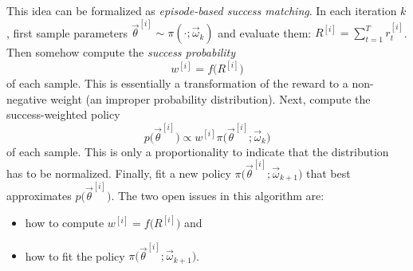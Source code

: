 		This idea can be formalized as \emph{episode-based success matching}. In each iteration \(k\), first sample parameters \( \vec{\theta}^{[i]} \sim \pi(\cdot; \vec{\omega}_k) \) and evaluate them: \( R^{[i]} = \sum_{t = 1}^{T} r_t^{[i]} \). Then somehow compute the \emph{success probability}
		\begin{equation*}
			w^{[i]} = f\big( R^{[i]} \big)
		\end{equation*}
		of each sample. This is essentially a transformation of the reward to a non-negative weight (an improper probability distribution). Next, compute the success-weighted policy
		\begin{equation*}
			p\big( \vec{\theta}^{[i]} \big) \propto w^{[i]} \pi\big( \vec{\theta}^{[i]}; \vec{\omega}_k \big)
		\end{equation*}
		of each sample. This is only a proportionality to indicate that the distribution has to be normalized. Finally, fit a new policy \( \pi\big( \vec{\theta}^{[i]}; \vec{\omega}_{k + 1} \big) \) that best approximates \( p\big( \vec{\theta}^{[i]} \big) \). The two open issues in this algorithm are:
		\begin{itemize}
			\item how to compute \( w^{[i]} = f\big( R^{[i]} \big) \) and
			\item how to fit the policy \( \pi\big( \vec{\theta}^{[i]}; \vec{\omega}_{k + 1} \big) \).
		\end{itemize}

